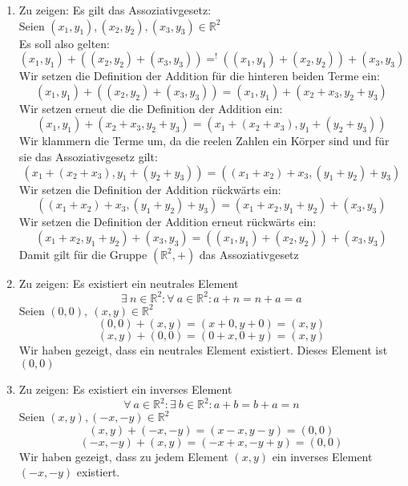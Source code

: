 \documentclass{article}
\begin{document}
    \begin{enumerate}[ label = (\alph*) ]

        \item Zu zeigen: Es gilt das Assoziativgesetz: \\
        Seien \( (x_1, y_1), (x_2, y_2), (x_3, y_3) \in \mathbb{R}^2 \) \\
        Es soll also gelten:
        \[ (x_1, y_1) + ((x_2, y_2) + (x_3, y_3)) =^! ((x_1, y_1) +  (x_2, y_2)) + (x_3, y_3) \]
        Wir setzen die Definition der Addition für die hinteren beiden Terme ein:
        \[ (x_1, y_1) + ((x_2, y_2) + (x_3, y_3)) = (x_1, y_1) + (x_2 + x_3, y_2 + y_3) \]
        Wir setzen erneut die die Definition der Addition ein:
        \[ (x_1, y_1) + (x_2 + x_3, y_2 + y_3) = ( x_1 + ( x_2 + x_3 ) , y_1 + ( y_2 + y_3) ) \]
        Wir klammern die Terme um, da die reelen Zahlen ein Körper sind und für sie das Assoziativgesetz gilt:
        \[ ( x_1 + ( x_2 + x_3 ) , y_1 + ( y_2 + y_3) ) = ( ( x_1 + x_2 ) + x_3, (y_1 + y_2) + y_3 ) \]
        Wir setzen die Definition der Addition rückwärts ein:
        \[ ( ( x_1 + x_2 ) + x_3, (y_1 + y_2) + y_3 ) = ( x_1 + x_2, y_1 + y_2 ) + (x_3, y_3) \]
        Wir setzen die Definition der Addition erneut rückwärts ein:
        \[ ( x_1 + x_2, y_1 + y_2 ) + (x_3, y_3) = ((x_1, y_1) +  (x_2, y_2)) + (x_3, y_3) \]
        Damit gilt für die Gruppe \( (\mathbb{R}^2, +) \) das Assoziativgesetz

        \item Zu zeigen: Es existiert ein neutrales Element
        \[ \exists \ n \in \mathbb{R}^2 : \forall \ a \in \mathbb{R}^2: a + n = n + a = a \]
        Seien \( (0, 0), \ (x, y) \in \mathbb{R}^2 \) \\
        \[ (0, 0) + (x, y) = (x + 0, y + 0) = (x , y) \]
        \[ (x, y) + (0, 0) = (0 + x, 0 + y) = (x , y) \]
        Wir haben gezeigt, dass ein neutrales Element existiert. Dieses Element ist \( (0, 0) \)

        \item Zu zeigen: Es existiert ein inverses Element
        \[ \forall \ a \in \mathbb{R}^2 : \exists \ b \in \mathbb{R}^2 : a + b = b + a = n \]
        Seien \( (x, y), (-x, -y) \in \mathbb{R}^2 \)
        \[ (x, y) + (-x, -y) = (x - x, y - y) = (0, 0) \]
        \[ (-x, -y) + (x, y) = (-x + x, -y + y) = (0, 0) \]
        Wir haben gezeigt, dass zu jedem Element \((x , y)\) ein inverses Element \((-x, -y)\) existiert.


\end{enumerate}
\end{document}
